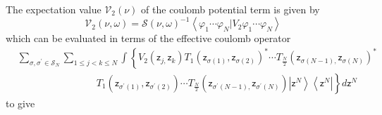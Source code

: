 \documentclass[aps,preprint]{revtex4}%
\begin{document}
The expectation value $\mathcal{V}_{2}\left(  \nu\right)  $ of the coulomb
potential term is given by
\begin{equation}
\mathcal{V}_{2}\left(  \nu,\omega\right)  =\mathcal{S}\left(  \nu
,\omega\right)  ^{-1}\left\langle \varphi_{1}\cdots\varphi_{N}\left\vert
V_{2}\right.  \varphi_{1}\cdots\varphi_{N}\right\rangle
\end{equation}
which can be evaluated in terms of the effective coulomb operator
\begin{align}
&
{\displaystyle\sum\limits_{\sigma,\sigma^{\prime}\in\mathcal{S}_{N}}}
{\displaystyle\sum\limits_{1\leq j<k\leq N}}
\int\left\{  V_{2}\left(  \mathsf{z}_{j,}\mathsf{z}_{k}\right)  T_{1}\left(
\mathsf{z}_{\sigma\left(  1\right)  },\mathsf{z}_{\sigma\left(  2\right)
}\right)  ^{\ast}\cdots T_{\frac{N}{2}}\left(  \mathsf{z}_{\sigma\left(
N-1\right)  ,}\mathsf{z}_{\sigma\left(  N\right)  }\right)  ^{\ast}\right.
\nonumber\\
&  \qquad\qquad\qquad\qquad\left.  T_{1}\left(  \mathsf{z}_{\sigma^{\prime
}\left(  1\right)  },\mathsf{z}_{\sigma^{\prime}\left(  2\right)  }\right)
\cdots T_{\frac{N}{2}}\left(  \mathsf{z}_{\sigma^{\prime}\left(  N-1\right)
,}\mathsf{z}_{\sigma^{\prime}\left(  N\right)  }\right)  \left\vert
\mathsf{z}^{N}\right\rangle \left\langle \mathsf{z}^{N}\right\vert \right\}
d\mathsf{z}^{N}%
\end{align}
to give%
\end{document}
